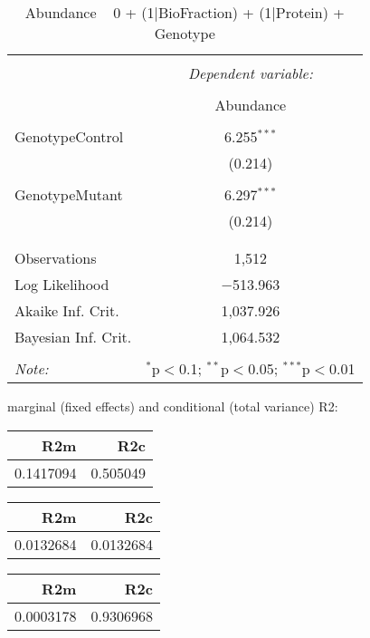 \documentclass[11pt]{report}
\begin{document}
\begin{table}[!htbp] \centering 
  \caption{Abundance ~ 0 + (1|BioFraction) + (1|Protein) + Genotype} 
  \label{} 
\begin{tabular}{@{\extracolsep{5pt}}lc} 
\\[-1.8ex]\hline 
\hline \\[-1.8ex] 
 & \multicolumn{1}{c}{\textit{Dependent variable:}} \\ 
\cline{2-2} 
\\[-1.8ex] & Abundance \\ 
\hline \\[-1.8ex] 
 GenotypeControl & 6.255$^{***}$ \\ 
  & (0.214) \\ 
  & \\ 
 GenotypeMutant & 6.297$^{***}$ \\ 
  & (0.214) \\ 
  & \\ 
\hline \\[-1.8ex] 
Observations & 1,512 \\ 
Log Likelihood & $-$513.963 \\ 
Akaike Inf. Crit. & 1,037.926 \\ 
Bayesian Inf. Crit. & 1,064.532 \\ 
\hline 
\hline \\[-1.8ex] 
\textit{Note:}  & \multicolumn{1}{r}{$^{*}$p$<$0.1; $^{**}$p$<$0.05; $^{***}$p$<$0.01} \\ 
\end{tabular} 
\end{table} 
marginal (fixed effects) and conditional (total variance) R2:

\begin{tabular}{r|r}
\hline
R2m & R2c\\
\hline
0.1417094 & 0.505049\\
\hline
\end{tabular}

\begin{tabular}{r|r}
\hline
R2m & R2c\\
\hline
0.0132684 & 0.0132684\\
\hline
\end{tabular}

\begin{tabular}{r|r}
\hline
R2m & R2c\\
\hline
0.0003178 & 0.9306968\\
\hline
\end{tabular}
\end{document}
